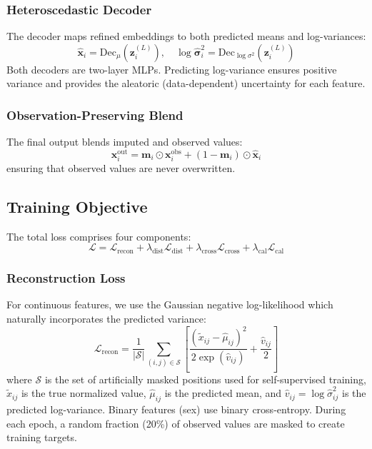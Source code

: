 \documentclass[journal,twoside,web]{ieeecolor}
\begin{document}
\subsubsection{Heteroscedastic Decoder}

The decoder maps refined embeddings to both predicted means and log-variances:
\begin{equation}
    \hat{\mathbf{x}}_i = \text{Dec}_\mu(\mathbf{z}_i^{(L)}), \quad \log \hat{\boldsymbol{\sigma}}_i^2 = \text{Dec}_{\log\sigma^2}(\mathbf{z}_i^{(L)})
\end{equation}
Both decoders are two-layer MLPs. Predicting log-variance ensures positive variance and provides the aleatoric (data-dependent) uncertainty for each feature.

\subsubsection{Observation-Preserving Blend}

The final output blends imputed and observed values:
\begin{equation}
    \mathbf{x}_i^{\text{out}} = \mathbf{m}_i \odot \mathbf{x}_i^{\text{obs}} + (1 - \mathbf{m}_i) \odot \hat{\mathbf{x}}_i
\end{equation}
ensuring that observed values are never overwritten.

\subsection{Training Objective}

The total loss comprises four components:
\begin{equation}
    \mathcal{L} = \mathcal{L}_{\text{recon}} + \lambda_{\text{dist}} \mathcal{L}_{\text{dist}} + \lambda_{\text{cross}} \mathcal{L}_{\text{cross}} + \lambda_{\text{cal}} \mathcal{L}_{\text{cal}}
    \label{eq:total_loss}
\end{equation}

\subsubsection{Reconstruction Loss}

For continuous features, we use the Gaussian negative log-likelihood which naturally incorporates the predicted variance:
\begin{equation}
    \mathcal{L}_{\text{recon}} = \frac{1}{|\mathcal{S}|} \sum_{(i,j) \in \mathcal{S}} \left[\frac{(\tilde{x}_{ij} - \hat{\mu}_{ij})^2}{2\exp(\hat{v}_{ij})} + \frac{\hat{v}_{ij}}{2}\right]
\end{equation}
where $\mathcal{S}$ is the set of artificially masked positions used for self-supervised training, $\tilde{x}_{ij}$ is the true normalized value, $\hat{\mu}_{ij}$ is the predicted mean, and $\hat{v}_{ij} = \log \hat{\sigma}_{ij}^2$ is the predicted log-variance. Binary features (sex) use binary cross-entropy. During each epoch, a random fraction (20\%) of observed values are masked to create training targets.
\end{document}
